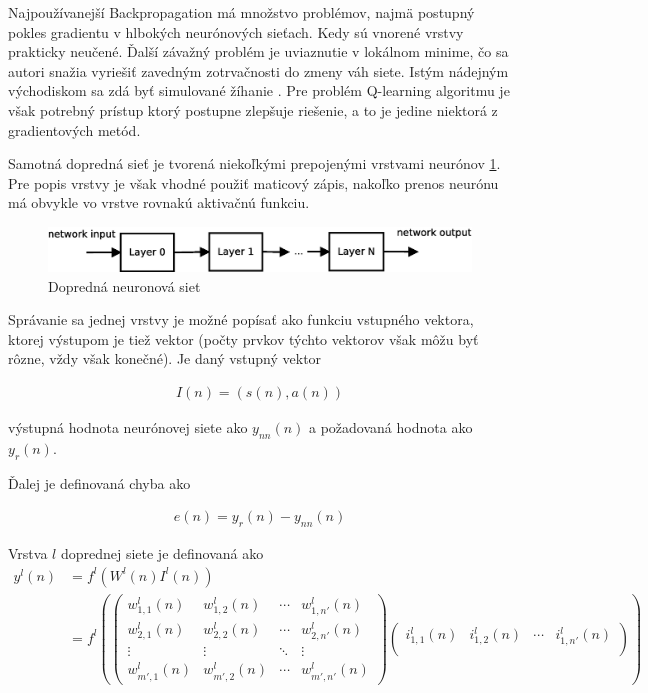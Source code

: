 Najpoužívanejší Backpropagation má množstvo problémov, najmä postupný pokles gradientu
v hlbokých neurónových sieťach. Kedy sú vnorené vrstvy prakticky neučené. Ďalší závažný problém
je uviaznutie v lokálnom minime, čo sa autori snažia vyriešiť zavedným zotrvačnosti
do zmeny váh siete. Istým nádejným východiskom sa zdá byť simulované žíhanie \cite{bib:annealing_01}.
Pre problém Q-learning algoritmu je však potrebný prístup ktorý postupne zlepšuje riešenie,
a to je jedine niektorá z gradientových metód.

Samotná dopredná sieť je tvorená niekoľkými prepojenými vrstvami neurónov \ref{img:ffnn}.
Pre popis vrstvy je však vhodné použiť maticový zápis, nakoľko prenos neurónu má
obvykle vo vrstve rovnakú aktivačnú funkciu.

\begin{figure}[!htb]
\center
\includegraphics[scale=.6]{../diagrams/neural_layers.eps}
\caption{Dopredná neuronová siet}
\label{img:ffnn}
\end{figure}

Správanie sa jednej vrstvy je možné popísať ako funkciu vstupného vektora,
ktorej výstupom je tiež vektor (počty prvkov týchto vektorov však môžu byť rôzne,
vždy však konečné).
Je daný vstupný vektor

\begin{align}
I(n) = (s(n), a(n))
\label{eq:nn_input_vector}
\end{align}

výstupná hodnota neurónovej siete ako $y_{nn}(n)$ a požadovaná hodnota ako $y_{r}(n)$.

Ďalej je definovaná chyba ako

\begin{align}
e(n) = y_{r}(n) - y_{nn}(n)
\label{eq:nn_error}
\end{align}

Vrstva $l$ doprednej siete je definovaná ako
\begin{align}
y^l(n) &= f^l\left(W^l(n)I^l(n)\right) \nonumber \\
 &= f^l\left(
 \begin{pmatrix}
  w^l_{1,1}(n) & w^l_{1,2}(n) & \cdots & w^l_{1,n'}(n) \\
  w^l_{2,1}(n) & w^l_{2,2}(n) & \cdots & w^l_{2,n'}(n) \\
  \vdots  & \vdots  & \ddots & \vdots  \\
  w^l_{m',1}(n)  & w^l_{m',2}(n)  & \cdots & w^l_{m',n'}(n)
 \end{pmatrix}
 \begin{pmatrix}
  i^l_{1,1}(n) & i^l_{1,2}(n) & \cdots & i^l_{1,n'}(n) \\
 \end{pmatrix}
 \right)
 \label{eq:nn_layer}
\end{align}


